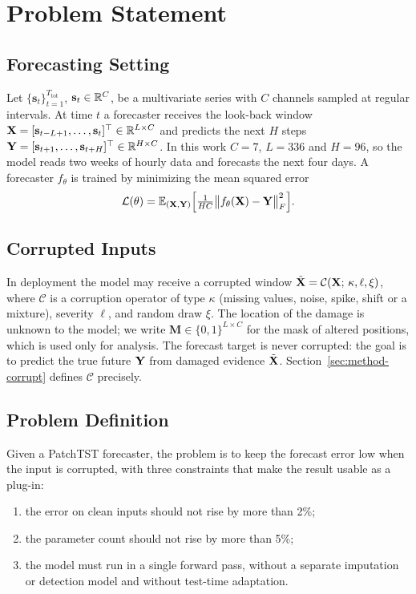 \section{Problem Statement}
\label{sec:problem}

\subsection{Forecasting Setting}

Let $\{\mathbf{s}_t\}_{t=1}^{T_{\mathrm{tot}}}$, $\mathbf{s}_t\in\mathbb{R}^{C}$, be a multivariate series with $C$ channels sampled at regular intervals. At time $t$ a forecaster receives the look-back window $\mathbf{X}=[\mathbf{s}_{t-L+1},\dots,\mathbf{s}_t]^{\top}\in\mathbb{R}^{L\times C}$ and predicts the next $H$ steps $\mathbf{Y}=[\mathbf{s}_{t+1},\dots,\mathbf{s}_{t+H}]^{\top}\in\mathbb{R}^{H\times C}$. In this work $C=7$, $L=336$ and $H=96$, so the model reads two weeks of hourly data and forecasts the next four days. A forecaster $f_\theta$ is trained by minimizing the mean squared error
\begin{equation}
\mathcal{L}(\theta)=\mathbb{E}_{(\mathbf{X},\mathbf{Y})}\Big[\tfrac{1}{HC}\big\lVert f_\theta(\mathbf{X})-\mathbf{Y}\big\rVert_F^2\Big].
\label{eq:mse}
\end{equation}

\subsection{Corrupted Inputs}

In deployment the model may receive a corrupted window $\tilde{\mathbf{X}}=\mathcal{C}(\mathbf{X};\,\kappa,\ell,\xi)$, where $\mathcal{C}$ is a corruption operator of type $\kappa$ (missing values, noise, spike, shift or a mixture), severity $\ell$, and random draw $\xi$. The location of the damage is unknown to the model; we write $\mathbf{M}\in\{0,1\}^{L\times C}$ for the mask of altered positions, which is used only for analysis. The forecast target is never corrupted: the goal is to predict the true future $\mathbf{Y}$ from damaged evidence $\tilde{\mathbf{X}}$. Section~\ref{sec:method-corrupt} defines $\mathcal{C}$ precisely.

\subsection{Problem Definition}

Given a PatchTST forecaster, the problem is to keep the forecast error low when the input is corrupted, with three constraints that make the result usable as a plug-in:
\begin{enumerate}
\item the error on clean inputs should not rise by more than 2\%;
\item the parameter count should not rise by more than 5\%;
\item the model must run in a single forward pass, without a separate imputation or detection model and without test-time adaptation.
\end{enumerate}

